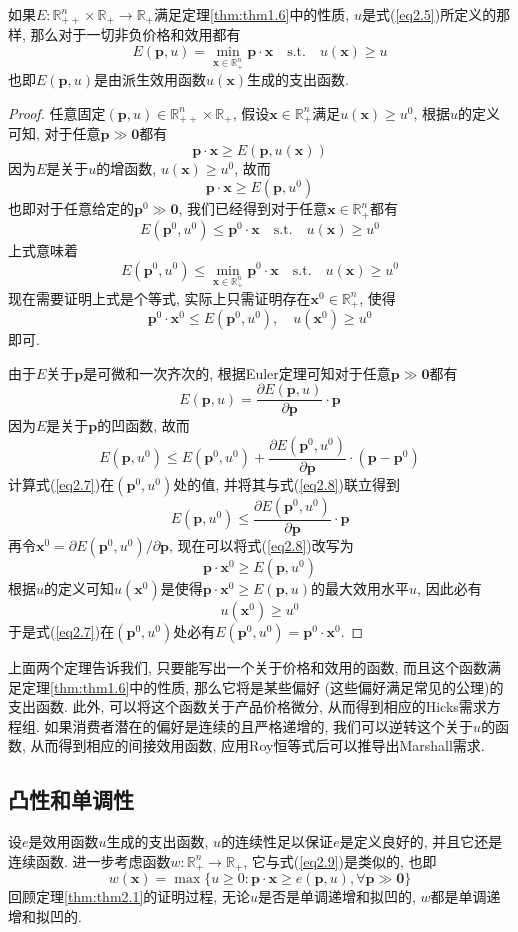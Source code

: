 \documentclass[cn, 12pt, math=mtpro2, bibstyle=apa, blue]{elegantbook}
\newcommand{\R}{\mathbb{R}}
\newcommand{\p}{\mathbf{p}}
\newcommand{\x}{\mathbf{x}}
\begin{document}
\begin{theorem}\label{thm:thm2.2}
  如果$E:\R_{++}^n\times\R_+\to\R_+$满足定理\ref{thm:thm1.6}中的性质, $u$是式(\ref{eq2.5})所定义的那样, 那么对于一切非负价格和效用都有
  $$E(\p,u)=\min_{\x\in\R_+^n}\p\cdot\x\quad\text{s.t.}\quad u(\x)\geq u$$
  也即$E(\p,u)$是由派生效用函数$u(\x)$生成的支出函数.
\end{theorem}
\begin{proof}
  任意固定$(\p,u)\in\R_{++}^n\times\R_+$, 假设$\x\in\R_+^n$满足$u(\x)\geq u^0$, 根据$u$的定义可知, 对于任意$\p\gg\mathbf{0}$都有
  $$\p\cdot\x\geq E(\p,u(\x))$$
  因为$E$是关于$u$的增函数, $u(\x)\geq u^0$, 故而
  $$\p\cdot\x\geq E(\p,u^0)$$
  也即对于任意给定的$\p^0\gg\mathbf{0}$, 我们已经得到对于任意$\x\in\R_+^n$都有
  $$E(\p^0,u^0)\leq \p^0\cdot\x\quad\text{s.t.}\quad u(\x)\ge u^0$$
  上式意味着
  $$E(\p^0,u^0)\leq\min_{\x\in\R_+^n}\p^0\cdot\x\quad\text{s.t.}\quad u(\x)\geq u^0$$
  现在需要证明上式是个等式, 实际上只需证明存在$\x^0\in\R_+^n$, 使得
  \begin{equation}\label{eq2.6}
    \p^0\cdot\x^0\leq E(\p^0,u^0),\quad u(\x^0)\geq u^0
  \end{equation}
  即可.

  由于$E$关于$\p$是可微和一次齐次的, 根据Euler定理可知对于任意$\p\gg\mathbf{0}$都有
  \begin{equation}\label{eq2.7}
    E(\p,u)=\frac{\partial E(\p,u)}{\partial\p}\cdot\p
  \end{equation}
  因为$E$是关于$\p$的凹函数, 故而
  \begin{equation}\label{eq2.8}
    E(\p,u^0)\leq E(\p^0,u^0)+\frac{\partial E(\p^0,u^0)}{\partial\p}\cdot(\p-\p^0)
  \end{equation}
  计算式(\ref{eq2.7})在$(\p^0,u^0)$处的值, 并将其与式(\ref{eq2.8})联立得到
  $$E(\p,u^0)\leq \frac{\partial E(\p^0,u^0)}{\partial\p}\cdot\p$$
  再令$\x^0=\partial E(\p^0,u^0)/\partial \p$, 现在可以将式(\ref{eq2.8})改写为
  $$\p\cdot\x^0\geq E(\p,u^0)$$
  根据$u$的定义可知$u(\x^0)$是使得$\p\cdot\x^0\geq E(\p,u)$的最大效用水平$u$, 因此必有$$u(\x^0)\geq u^0$$于是式(\ref{eq2.7})在$(\p^0,u^0)$处必有$E(\p^0,u^0)=\p^0\cdot\x^0$.
\end{proof}
上面两个定理告诉我们, 只要能写出一个关于价格和效用的函数, 而且这个函数满足定理\ref{thm:thm1.6}中的性质, 那么它将是某些偏好 (这些偏好满足常见的公理)的支出函数. 此外, 可以将这个函数关于产品价格微分, 从而得到相应的Hicks需求方程组. 如果消费者潜在的偏好是连续的且严格递增的, 我们可以逆转这个关于$u$的函数, 从而得到相应的间接效用函数, 应用Roy恒等式后可以推导出Marshall需求.
\subsection{凸性和单调性}
设$e$是效用函数$u$生成的支出函数, $u$的连续性足以保证$e$是定义良好的, 并且它还是连续函数. 进一步考虑函数$w:\R_+^n\to\R_+$, 它与式(\ref{eq2.9})是类似的, 也即
\begin{equation}\label{eq2.10}
  w(\x)=\max\{u\ge0:\p\cdot\x\ge e(\p,u),\forall\p\gg\mathbf{0}\}
\end{equation}
回顾定理\ref{thm:thm2.1}的证明过程, 无论$u$是否是单调递增和拟凹的, $w$都是单调递增和拟凹的.
\end{document}
